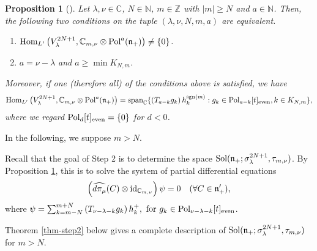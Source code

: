 \documentclass[12pt, pdflatex, a4paper]{article}
\theoremstyle{plain}
\newtheorem{prop}[thm]{Proposition}
\theoremstyle{definition}
\def\C{{\mathbb C}}
\def\Hom{\text{\normalfont{Hom}}}
\def\id{\text{\normalfont{id}}}
\def\N{{\mathbb N}}
\def\n{\mathfrak{n}}
\def\Pol{\text{\normalfont{Pol}}}
\def\sgn{\text{\normalfont{sgn}}}
\def\Sol{\text{\normalfont{Sol}}}
\def\spanned{\text{\normalfont{span}}}
\def\Z{{\mathbb Z}}
\begin{document}
\begin{prop}[{\cite[Prop. 4.3]{Per-Val24}}]\label{prop-FirststepFmethod} Let $\lambda, \nu \in \C$, $N \in \N$, $m \in \Z$ with $|m| \geq N$ and $a \in \N$. Then, the following two conditions on the tuple $(\lambda, \nu, N, m, a)$ are equivalent.
\begin{enumerate}[label=\normalfont{(\roman*)}, topsep=3pt]
\item $\Hom_{L^\prime}\left(V^{2N+1}_\lambda, \C_{m, \nu} \otimes \Pol^a(\n_+)\right) \neq \{0\}$.
\item $a = \nu - \lambda$ and $a \geq \min K_{N,m}$.
\end{enumerate}
Moreover, if one (therefore all) of the conditions above is satisfied, we have
\begin{equation*}
\begin{gathered}
\Hom_{L^\prime}\left(V^{2N+1}_\lambda, \C_{m, \nu} \otimes \Pol^a(\n_+)\right)= 
\spanned_\C\{\left(T_{a-k}g_k\right)h_k^{\sgn(m)}: g_k \in \Pol_{a-k}[t]_\text{{\normalfont{even}}}, k\in K_{N,m}\},
\end{gathered}
\end{equation*}
where we regard $\Pol_{d}[t]_\text{{\normalfont{even}}} = \{0\}$ for $d < 0$.
\end{prop}

In the following, we suppose $m > N$.

Recall that the goal of Step 2 is to determine the space $\Sol(\n_+; \sigma_\lambda^{2N+1}, \tau_{m, \nu})$. By Proposition \ref{prop-FirststepFmethod}, this is to solve the system of partial differential equations
\begin{equation*}
\left(\widehat{d\pi_\mu}(C)\otimes \id_{\C_{m, \nu}}\right)\psi = 0 \quad (\forall C\in \n_+^\prime),
\end{equation*}
where  $\psi = \sum_{k =m-N}^{m+N}\left(T_{\nu-\lambda-k}g_k\right)h_k^+, \text{ for } g_k \in \Pol_{\nu-\lambda-k}[t]_\text{{\normalfont{even}}}$.

Theorem \ref{thm-step2} below gives a complete description of $\Sol(\n_+; \sigma_\lambda^{2N+1}, \tau_{m, \nu})$ for $m > N$.
\end{document}
